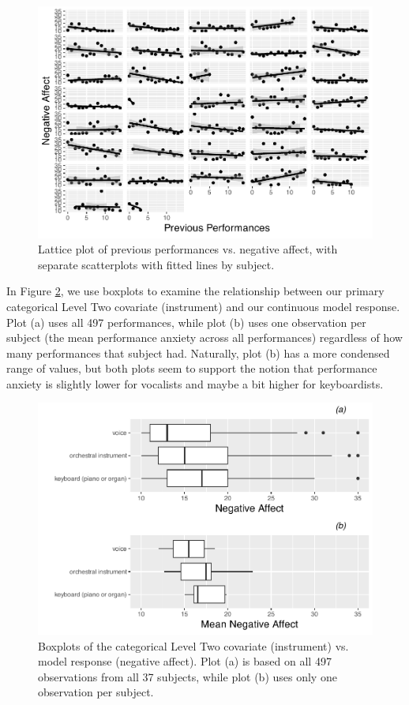 \documentclass[
]{krantz}
\begin{document}
\begin{figure}

{\centering \includegraphics[width=0.6\linewidth]{bookdown-BeyondMLR_files/figure-latex/mli-lattice3-1} 

}

\caption{Lattice plot of previous performances vs. negative affect, with separate scatterplots with fitted lines by subject.}\label{fig:mli-lattice3}
\end{figure}

In Figure \ref{fig:mli-boxmat1}, we use boxplots to examine the relationship between our primary categorical Level Two covariate (instrument) and our continuous model response. Plot (a) uses all 497 performances, while plot (b) uses one observation per subject (the mean performance anxiety across all performances) regardless of how many performances that subject had. Naturally, plot (b) has a more condensed range of values, but both plots seem to support the notion that performance anxiety is slightly lower for vocalists and maybe a bit higher for keyboardists.

\begin{figure}

{\centering \includegraphics[width=0.6\linewidth]{bookdown-BeyondMLR_files/figure-latex/mli-boxmat1-1} 

}

\caption{Boxplots of the categorical Level Two covariate (instrument) vs. model response (negative affect).  Plot (a) is based on all 497 observations from all 37 subjects, while plot (b) uses only one observation per subject.}\label{fig:mli-boxmat1}
\end{figure}
\end{document}
